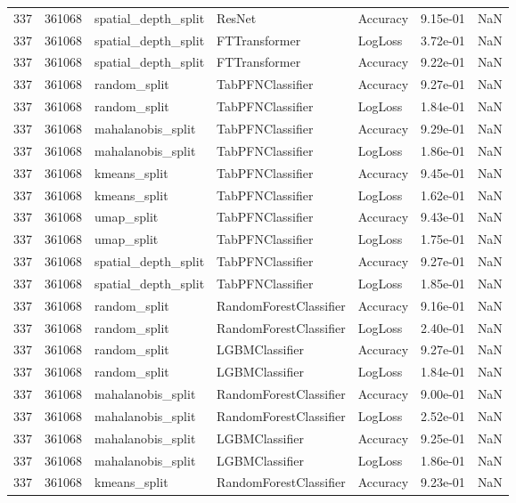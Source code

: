 \begin{tabular}{rrlllrr}
337 & 361068 & spatial\_depth\_split & ResNet & Accuracy & 9.15e-01 & NaN \\
337 & 361068 & spatial\_depth\_split & FTTransformer & LogLoss & 3.72e-01 & NaN \\
337 & 361068 & spatial\_depth\_split & FTTransformer & Accuracy & 9.22e-01 & NaN \\
337 & 361068 & random\_split & TabPFNClassifier & Accuracy & 9.27e-01 & NaN \\
337 & 361068 & random\_split & TabPFNClassifier & LogLoss & 1.84e-01 & NaN \\
337 & 361068 & mahalanobis\_split & TabPFNClassifier & Accuracy & 9.29e-01 & NaN \\
337 & 361068 & mahalanobis\_split & TabPFNClassifier & LogLoss & 1.86e-01 & NaN \\
337 & 361068 & kmeans\_split & TabPFNClassifier & Accuracy & 9.45e-01 & NaN \\
337 & 361068 & kmeans\_split & TabPFNClassifier & LogLoss & 1.62e-01 & NaN \\
337 & 361068 & umap\_split & TabPFNClassifier & Accuracy & 9.43e-01 & NaN \\
337 & 361068 & umap\_split & TabPFNClassifier & LogLoss & 1.75e-01 & NaN \\
337 & 361068 & spatial\_depth\_split & TabPFNClassifier & Accuracy & 9.27e-01 & NaN \\
337 & 361068 & spatial\_depth\_split & TabPFNClassifier & LogLoss & 1.85e-01 & NaN \\
337 & 361068 & random\_split & RandomForestClassifier & Accuracy & 9.16e-01 & NaN \\
337 & 361068 & random\_split & RandomForestClassifier & LogLoss & 2.40e-01 & NaN \\
337 & 361068 & random\_split & LGBMClassifier & Accuracy & 9.27e-01 & NaN \\
337 & 361068 & random\_split & LGBMClassifier & LogLoss & 1.84e-01 & NaN \\
337 & 361068 & mahalanobis\_split & RandomForestClassifier & Accuracy & 9.00e-01 & NaN \\
337 & 361068 & mahalanobis\_split & RandomForestClassifier & LogLoss & 2.52e-01 & NaN \\
337 & 361068 & mahalanobis\_split & LGBMClassifier & Accuracy & 9.25e-01 & NaN \\
337 & 361068 & mahalanobis\_split & LGBMClassifier & LogLoss & 1.86e-01 & NaN \\
337 & 361068 & kmeans\_split & RandomForestClassifier & Accuracy & 9.23e-01 & NaN \\

\end{tabular}

